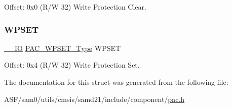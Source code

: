 Offset\+: 0x0 (R/W 32) Write Protection Clear. 

\mbox{\label{struct_pac_a6c7726505b7c3dc8aa8f09e9ba0e4be0}} 
\subsubsection{\texorpdfstring{WPSET}{WPSET}}
{\footnotesize\ttfamily \mbox{\hyperlink{core__cm0plus_8h_aec43007d9998a0a0e01faede4133d6be}{\+\_\+\+\_\+\+IO}} \mbox{\hyperlink{union_p_a_c___w_p_s_e_t___type}{P\+A\+C\+\_\+\+W\+P\+S\+E\+T\+\_\+\+Type}} W\+P\+S\+ET}



Offset\+: 0x4 (R/W 32) Write Protection Set. 



The documentation for this struct was generated from the following file\+:\begin{DoxyCompactItemize}
\item 
A\+S\+F/sam0/utils/cmsis/samd21/include/component/\mbox{\hyperlink{pac_8h}{pac.\+h}}\end{DoxyCompactItemize}
